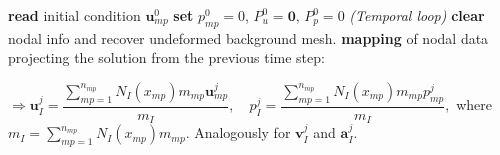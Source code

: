 \documentclass[11pt,english]{article}
\def\mp{\textit{mp}}
\begin{document}
   \begin{algorithm}[h!]
  \footnotesize
    \caption{General algorithm for the mixed MPM using VMS. \label{alg:GeneralAlgorithm}}
    \label{euclid}
    \begin{algorithmic}[1] %
     \State \textbf{read} initial condition $\boldsymbol{u}_{\mp}^0$
     \State \textbf{set} $p_{\mp}^0=0$, $P^0_u=\boldsymbol{0}$, $P^0_p=0$
     \textit{(Temporal loop)}
        \State {}
        \State \textbf{clear} nodal info and recover undeformed background mesh.
        \State \textbf{mapping} of nodal data projecting the solution from the previous time step:
            

            \State \hspace{\algorithmicindent}   $ \Rightarrow \boldsymbol{u}^j_I=\dfrac{\sum^{n_{\mp}}_{\mp=1} N_I(x_{\mp}) m_{\mp} \boldsymbol{u}^j_{\mp}}{m_I}, \quad p^j_I=\dfrac{\sum^{n_{\mp}}_{\mp=1} N_I(x_{\mp}) m_{\mp} p^j_{\mp}}{m_I},$
            \State \hspace{\algorithmicindent}  where $m_I=\sum^{n_{\mp}}_{\mp=1} N_I(x_{\mp}) m_{\mp}$. Analogously for $\boldsymbol{v}^j_I$ and $\boldsymbol{a}^j_I$.
            

\end{algorithmic}
\end{algorithm}
\end{document}
